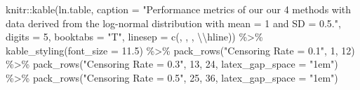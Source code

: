 \documentclass[12pt, twoside]{amherstthesis}
\newenvironment{Shaded}{\begin{snugshade}}{\end{snugshade}}
\newcommand{\AttributeTok}[1]{\textcolor[rgb]{0.77,0.63,0.00}{#1}}
\newcommand{\DecValTok}[1]{\textcolor[rgb]{0.00,0.00,0.81}{#1}}
\newcommand{\FloatTok}[1]{\textcolor[rgb]{0.00,0.00,0.81}{#1}}
\newcommand{\FunctionTok}[1]{\textcolor[rgb]{0.00,0.00,0.00}{#1}}
\newcommand{\NormalTok}[1]{#1}
\newcommand{\SpecialCharTok}[1]{\textcolor[rgb]{0.00,0.00,0.00}{#1}}
\newcommand{\StringTok}[1]{\textcolor[rgb]{0.31,0.60,0.02}{#1}}
\begin{document}
\begin{Shaded}
\begin{Highlighting}[]
\NormalTok{knitr}\SpecialCharTok{::}\FunctionTok{kable}\NormalTok{(ln.table, }\AttributeTok{caption =} \StringTok{"Performance metrics of our our }
\StringTok{             4 methods with data derived from the log{-}normal }
\StringTok{             distribution with mean = 1 and SD = 0.5."}\NormalTok{, }
             \AttributeTok{digits =} \DecValTok{5}\NormalTok{, }\AttributeTok{booktabs =} \StringTok{"T"}\NormalTok{, }\AttributeTok{linesep =} \FunctionTok{c}\NormalTok{(}\StringTok{\textquotesingle{}\textquotesingle{}}\NormalTok{, }\StringTok{\textquotesingle{}\textquotesingle{}}\NormalTok{, }\StringTok{\textquotesingle{}\textquotesingle{}}\NormalTok{, }\StringTok{\textquotesingle{}}\SpecialCharTok{\textbackslash{}\textbackslash{}}\StringTok{hline\textquotesingle{}}\NormalTok{)) }\SpecialCharTok{\%\textgreater{}\%}
  \FunctionTok{kable\_styling}\NormalTok{(}\AttributeTok{font\_size =} \FloatTok{11.5}\NormalTok{) }\SpecialCharTok{\%\textgreater{}\%}
  \FunctionTok{pack\_rows}\NormalTok{(}\StringTok{"Censoring Rate = 0.1"}\NormalTok{, }\DecValTok{1}\NormalTok{, }\DecValTok{12}\NormalTok{) }\SpecialCharTok{\%\textgreater{}\%}
  \FunctionTok{pack\_rows}\NormalTok{(}\StringTok{"Censoring Rate = 0.3"}\NormalTok{, }\DecValTok{13}\NormalTok{, }\DecValTok{24}\NormalTok{, }\AttributeTok{latex\_gap\_space =} \StringTok{"1em"}\NormalTok{) }\SpecialCharTok{\%\textgreater{}\%}
  \FunctionTok{pack\_rows}\NormalTok{(}\StringTok{"Censoring Rate = 0.5"}\NormalTok{, }\DecValTok{25}\NormalTok{, }\DecValTok{36}\NormalTok{, }\AttributeTok{latex\_gap\_space =} \StringTok{"1em"}\NormalTok{)}
\end{Highlighting}
\end{Shaded}
\end{document}
